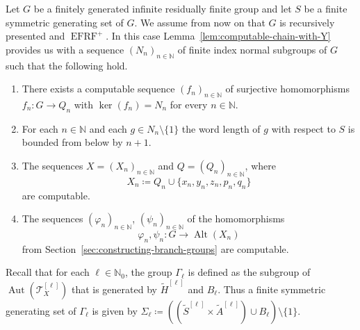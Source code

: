 \documentclass[a4paper]{amsart}
\numberwithin{equation}{section}
\theoremstyle{definition}
\theoremstyle{remark}
\newcommand{\N}{\mathbb{N}}
\DeclareMathOperator{\Alt}{Alt}
\DeclareMathOperator{\Aut}{Aut}
\DeclareMathOperator{\EFRF}{EFRF}
\newcommand{\T}{\mathcal{T}}
\newcommand{\defeq}\coloneqq%
\begin{document}
Let $G$ be a finitely generated infinite residually finite group and let $S$ be a finite symmetric generating set of $G$.
We assume from now on that $G$ is recursively presented and $\EFRF^{+}$.
In this case Lemma~\ref{lem:computable-chain-with-Y} provides us with a sequence $(N_n)_{n \in \N}$ of finite index normal subgroups of $G$ such that the following hold.
\begin{enumerate}
\item There exists a computable sequence $(f_n)_{n \in \N}$ of surjective homomorphisms $f_n \colon G \rightarrow Q_n$ with $\ker(f_n) = N_n$ for every $n \in \N$.
\item For each $n \in \N$ and each $g \in N_n \setminus \{1\}$ the word length of $g$ with respect to $S$ is bounded from below by $n+1$.\label{eq:word-length-bounded-below}
\item The sequences $X = (X_n)_{n \in \N}$ and $Q = (Q_n)_{n \in \N}$, where
\[
X_n \defeq Q_n \cup \{x_n,y_n,z_n,p_n,q_n\}
\]
are computable.\label{eq:computable-alphabets}
\item The sequences $(\varphi_n)_{n \in \N}$, $(\psi_n)_{n \in \N}$
of the homomorphisms
\[
\varphi_n,\psi_n \colon G \rightarrow \Alt(X_n)
\]
from Section~\ref{sec:constructing-branch-groups} are computable.\label{eq:computable-phi-and-psi}
\end{enumerate}

\medskip

\noindent Recall that for each $\ell \in \N_0$, the group $\Gamma_{\ell}$ is defined as the subgroup of $\Aut(\T_X^{[\ell]})$ that is generated by $\widetilde{H}^{[\ell]}$ and $B_{\ell}$.
Thus a finite symmetric generating set of $\Gamma_{\ell}$ is given by $\Sigma_{\ell} \defeq ((\widetilde{S}^{[\ell]} \times \widetilde{A}^{[\ell]}) \cup B_{\ell}) \setminus \{1\}$.
\end{document}
